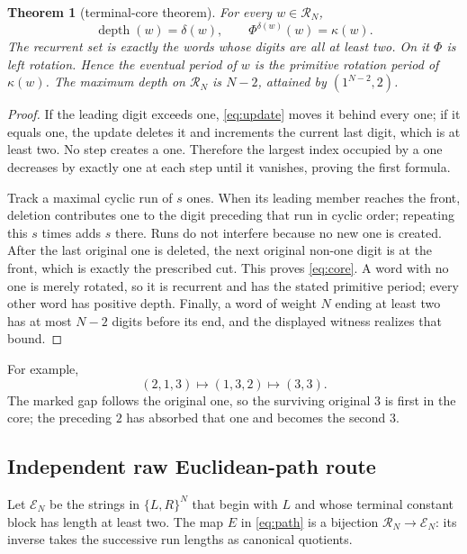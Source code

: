 \documentclass[10pt,a4paper]{amsart}
\newtheorem{theorem}{Theorem}[section]
\theoremstyle{definition}
\theoremstyle{remark}
\newcommand{\R}{\mathcal R}
\newcommand{\depth}{\operatorname{depth}}
\begin{document}
\begin{theorem}[terminal-core theorem]\label{thm:core}
For every $w\in\R_N$,
\begin{equation}
 \depth(w)=\delta(w),\qquad
 \Phi^{\delta(w)}(w)=\kappa(w).                         \label{eq:core}
\end{equation}
The recurrent set is exactly the words whose digits are all at least two.
On it $\Phi$ is left rotation.  Hence the eventual period of $w$ is the
primitive rotation period of $\kappa(w)$.  The maximum depth on $\R_N$ is
$N-2$, attained by $(1^{N-2},2)$.
\end{theorem}

\begin{proof}
If the leading digit exceeds one, \eqref{eq:update} moves it behind every
one; if it equals one, the update deletes it and increments the current last
digit, which is at least two.  No step creates a one.  Therefore the largest
index occupied by a one decreases by exactly one at each step until it
vanishes, proving the first formula.

Track a maximal cyclic run of $s$ ones.  When its leading member reaches the
front, deletion contributes one to the digit preceding that run in cyclic
order; repeating this $s$ times adds $s$ there.  Runs do not interfere because
no new one is created.  After the last original one is deleted, the next
original non-one digit is at the front, which is exactly the prescribed cut.
This proves \eqref{eq:core}.  A word with no one is merely rotated, so it is
recurrent and has the stated primitive period; every other word has positive
depth.  Finally, a word of weight $N$ ending at least two has at most $N-2$
digits before its end, and the displayed witness realizes that bound.
\end{proof}

For example,
\[
 (2,1,3)\longmapsto(1,3,2)\longmapsto(3,3).
\]
The marked gap follows the original one, so the surviving original $3$ is
first in the core; the preceding $2$ has absorbed that one and becomes the
second $3$.

\subsection{Independent raw Euclidean-path route}

Let $\mathcal E_N$ be the strings in $\{L,R\}^N$ that begin with $L$ and
whose terminal constant block has length at least two.  The map $E$ in
\eqref{eq:path} is a bijection $\R_N\to\mathcal E_N$: its inverse takes the
successive run lengths as canonical quotients.
\end{document}
